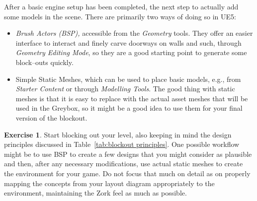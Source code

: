 \documentclass[a4paper]{tufte-handout}
\theoremstyle{definition}
\newtheorem{exercise}{Exercise}
\begin{document}
	After a basic engine setup has been completed, the next step to actually add some models in the scene. There are primarily two ways of doing so in UE5:
	\begin{itemize}
		\item \emph{Brush Actors (BSP),} accessible from the \emph{Geometry} tools. They offer an easier interface to interact and finely carve doorways on walls and such, through \emph{Geometry Editing Mode}, so they are a good starting point to generate some block--outs quickly.
		\item Simple Static Meshes, which can be used to place basic models, e.g., from \emph{Starter Content} or through \emph{Modelling Tools}. The good thing with static meshes is that it is easy to replace with the actual asset meshes that will be used in the Greybox, so it might be a good idea to use them for your final version of the blockout.
	\end{itemize}

	\begin{exercise}
		Start blocking out your level, also keeping in mind the design principles discussed in Table~\ref{tab:blockout principles}. One possible workflow might be to use BSP to create a few designs that you might consider as plausible and then, after any necessary modifications, use actual static meshes to create the environment for your game. Do not focus that much on detail as on properly mapping the concepts from your layout diagram appropriately to the environment, maintaining the Zork feel as much as possible.
	\end{exercise}
\end{document}
